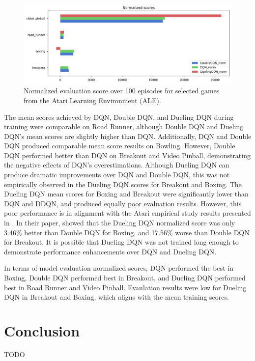 \documentclass{article}
\begin{document}
\begin{figure}[ht]
    \centering
    \includegraphics[width=\linewidth]{norm_scores.png}
    \caption{Normalized evaluation score over 100 episodes for selected games from the Atari Learning Environment (ALE).}
    \label{fig:eval}
\end{figure}

The mean scores achieved by DQN, Double DQN, and Dueling DQN during training 
were comparable on Road Runner, although Double DQN and Dueling DQN's mean scores
are slightly higher than DQN.  Additionally, DQN and Double DQN produced  comparable 
mean score results on Bowling. However, Double DQN performed better than DQN on  
Breakout and Video Pinball, demonstrating the negative effects of DQN's 
overestimations.  Although Dueling DQN can produce dramatic improvements over 
DQN and Double DQN, this was not empirically observed in the Dueling DQN scores
for Breakout and Boxing. The Dueling DQN mean scores for Boxing and Breakout were 
significantly lower than DQN and DDQN, and produced equally poor evaluation results. 
However, this poor performance is in alignment with the Atari empirical study results 
presented in \cite{wang2016dueling}. In their paper, \cite{wang2016dueling} showed 
that the Dueling DQN normalized score was only 3.46\% better than Double DQN for 
Boxing, and 17.56\% worse than Double DQN for Breakout. It is possible that Dueling 
DQN was not trained long enough to demonstrate performance enhancements over DQN and
Dueling DQN.

In terms of model evaluation normalized scores, DQN performed the best in Boxing, 
Double DQN performed best in Breakout, and Dueling DQN performed best in Road Runner 
and Video Pinball. Evaulation results were low for Dueling DQN in Breakout and Boxing, which aligns with the mean training scores.

\section{Conclusion}
TODO


\end{document}
